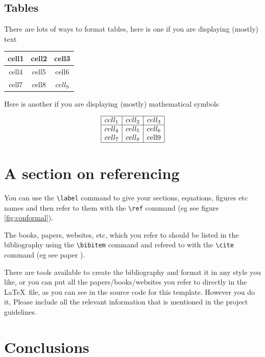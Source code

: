 \documentclass[a4paper,11pt]{article}
\numberwithin{equation}{section}
\theoremstyle{definition}
\begin{document}
\subsection{Tables}

There are lots of ways to format tables, here is one if you are
displaying (mostly) text

\begin{center}
	\begin{tabular}{ |c|c|c| } 
		\hline
		cell1 & cell2 & cell3 \\ \hline
		cell4 & cell5 & cell6 \\ 
		cell7 & cell8 & $cell_9$ \\ 
		\hline
	\end{tabular}
\end{center}

Here is another if you are displaying (mostly) mathematical symbols

\[
	\begin{array}{ |c|c|c| } 
		\hline
		cell_1 & cell_2 & cell_3 \\ \hline
		cell_4 & cell_5 & cell_6 \\ 
		cell_7 & cell_8 & \hbox{cell9} \\ 
		\hline
	\end{array}
\]


\section{A section on referencing}

You can use the \verb#\label# command to give your sections,
equations, figures etc names and then refer to them with the
\verb#\ref# command (eg see figure \ref{fig:conformal}).

The books, papers, websites, etc, which you refer to should be listed
in the bibliography using the \verb#\bibitem# command and refered to
with the \verb#\cite# command (eg see paper \cite{wilson}).

There are tools available to create the bibliography and format it in
any style you like, or you can put all the papers/books/websites you
refer to directly in the \LaTeX\ file, as you can see in the source
code for this template.  However you do it, Please include all the
relevant information that is mentioned in the project guidelines.

\section{Conclusions}
\end{document}
